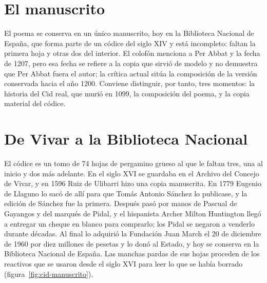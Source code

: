 \documentclass{book}
\begin{document}

\section{El manuscrito}

El poema se conserva en un único manuscrito, hoy en la Biblioteca Nacional de España, que forma parte de un códice del siglo XIV y está incompleto: faltan la primera hoja y otras dos del interior. El colofón menciona a Per Abbat y la fecha de 1207, pero esa fecha se refiere a la copia que sirvió de modelo y no demuestra que Per Abbat fuera el autor; la crítica actual sitúa la composición de la versión conservada hacia el año 1200. Conviene distinguir, por tanto, tres momentos: la historia del Cid real, que murió en 1099, la composición del poema, y la copia material del códice.


\section{De Vivar a la Biblioteca Nacional}

El códice es un tomo de 74 hojas de pergamino grueso al que le faltan tres, una al inicio y dos más adelante. En el siglo XVI se guardaba en el Archivo del Concejo de Vivar, y en 1596 Ruiz de Ulibarri hizo una copia manuscrita. En 1779 Eugenio de Llaguno lo sacó de allí para que Tomás Antonio Sánchez lo publicase, y la edición de Sánchez fue la primera. Después pasó por manos de Pascual de Gayangos y del marqués de Pidal, y el hispanista Archer Milton Huntington llegó a entregar un cheque en blanco para comprarlo; los Pidal se negaron a venderlo durante décadas. Al final lo adquirió la Fundación Juan March el 20 de diciembre de 1960 por diez millones de pesetas y lo donó al Estado, y hoy se conserva en la Biblioteca Nacional de España. Las manchas pardas de sus hojas proceden de los reactivos que se usaron desde el siglo XVI para leer lo que se había borrado (figura~\ref{fig:cid-manuscrito}).

\end{document}
